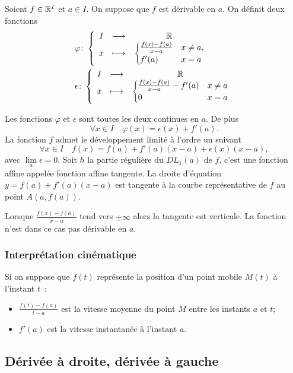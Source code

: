Soient \(f \in \mathbb{R}^I\) et \(a \in I\). On suppose que \(f\) est dérivable en 
\(a\). On définit deux fonctions
\begin{align*}
  &\varphi\colon \left\{\begin{array}{ccc} I & \longrightarrow &\mathbb{R}\\ x & \longmapsto & \begin{cases}\frac{f(x)-f(a)}{x-a} & x \neq a, 
    \\ f'(a) & x=a\end{cases} \end{array} \right. \\ 
    &\epsilon\colon \left\{\begin{array}{ccc} I & \longrightarrow &\mathbb{R}\\ x & \longmapsto & \begin{cases}\frac{f(x)-f(a)}{x-a} -f'(a)& x 
    \neq a \\ 0 & x=a\end{cases} \end{array} \right.
\end{align*}
%
\begin{prop}
  Les fonctions \(\varphi\) et \(\epsilon\) sont toutes les deux continues en 
  \(a\). De plus
  \begin{equation}
    \forall x \in I \quad \varphi(x) = \epsilon(x) +f'(a).
  \end{equation}
  La fonction \(f\) admet le développement limité à l'ordre un suivant
  \begin{equation}
    \forall x \in I \quad f(x) = f(a) + f'(a)(x-a) + \epsilon(x)(x-a),
  \end{equation}
  avec \(\lim\limits_{a} \epsilon=0\). Soit \(h\) la partie régulière du 
  \(DL_1(a)\) de \(f\), c'est une fonction affine appelée fonction affine 
  tangente. La droite d'équation \(y=f(a)+f'(a)(x-a)\) est tangente à la courbe 
  représentative de \(f\) au point \(A(a,f(a))\).
\end{prop}
%
Lorsque \(\frac{f(x)-f(a)}{x-a}\) tend vers \(\pm\infty\) alors la tangente est 
verticale. La fonction n'est dans ce cas pas dérivable en \(a\).

\subsubsection{Interprétation cinématique}
Si on suppose que \(f(t)\) représente la position d'un point mobile \(M(t)\) à 
l'instant \(t\)~:
\begin{itemize}
  \item \(\frac{f(t)-f(a)}{t-a}\) est la vitesse moyenne du point \(M\) entre 
    les instants \(a\) et \(t\);
  \item \(f'(a)\) est la vitesse instantanée à l'instant \(a\).
\end{itemize}

\subsection{Dérivée à droite, dérivée à gauche}

